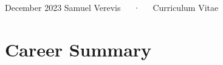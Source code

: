 \documentclass[11pt,a4paper,]{awesome-cv}
\begin{document}
\makecvheader

\makecvfooter
  {December 2023}
    {Samuel Verevis~~~·~~~Curriculum Vitae}
  {\thepage}





\hypertarget{career-summary}{%
\section{Career Summary}\label{career-summary}}
\end{document}
